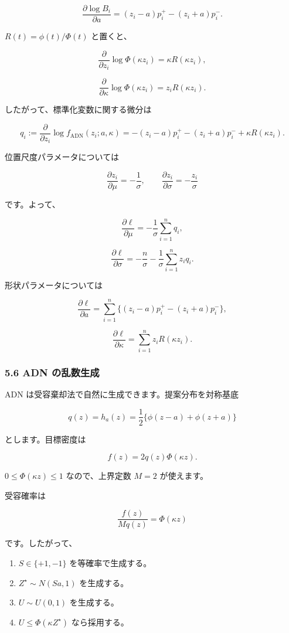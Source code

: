 \documentclass[
]{article}
\providecommand{\tightlist}{%
  \setlength{\itemsep}{0pt}\setlength{\parskip}{0pt}}
\begin{document}
\[
\frac{\partial \log B_i}{\partial a}
=(z_i-a)p_i^+-(z_i+a)p_i^-.
\]

\(R(t)=\phi(t)/\Phi(t)\) と置くと、

\[
\frac{\partial}{\partial z_i}\log\Phi(\kappa z_i)
=\kappa R(\kappa z_i),
\]

\[
\frac{\partial}{\partial \kappa}\log\Phi(\kappa z_i)
=z_iR(\kappa z_i).
\]

したがって、標準化変数に関する微分は

\[
q_i:=\frac{\partial}{\partial z_i}\log f_{\mathrm{ADN}}(z_i;a,\kappa)
=-(z_i-a)p_i^+-(z_i+a)p_i^-+\kappa R(\kappa z_i).
\]

位置尺度パラメータについては

\[
\frac{\partial z_i}{\partial \mu}=-\frac{1}{\sigma},
\qquad
\frac{\partial z_i}{\partial \sigma}=-\frac{z_i}{\sigma}
\]

です。よって、

\[
\frac{\partial \ell}{\partial \mu}
=-\frac{1}{\sigma}\sum_{i=1}^{n}q_i,
\]

\[
\frac{\partial \ell}{\partial \sigma}
=-\frac{n}{\sigma}-\frac{1}{\sigma}\sum_{i=1}^{n}z_iq_i.
\]

形状パラメータについては

\[
\frac{\partial \ell}{\partial a}
=\sum_{i=1}^{n}\{(z_i-a)p_i^+-(z_i+a)p_i^-\},
\]

\[
\frac{\partial \ell}{\partial \kappa}
=\sum_{i=1}^{n}z_iR(\kappa z_i).
\]

\hypertarget{adn-ux306eux4e71ux6570ux751fux6210}{%
\subsubsection{5.6 ADN
の乱数生成}\label{adn-ux306eux4e71ux6570ux751fux6210}}

ADN は受容棄却法で自然に生成できます。提案分布を対称基底

\[
q(z)=h_a(z)=\frac{1}{2}\{\phi(z-a)+\phi(z+a)\}
\]

とします。目標密度は

\[
f(z)=2q(z)\Phi(\kappa z).
\]

\(0\le \Phi(\kappa z)\le 1\) なので、上界定数 \(M=2\) が使えます。

受容確率は

\[
\frac{f(z)}{Mq(z)}=\Phi(\kappa z)
\]

です。したがって、

\begin{enumerate}
\def\labelenumi{\arabic{enumi}.}
\tightlist
\item
  \(S\in\{+1,-1\}\) を等確率で生成する。
\item
  \(Z^\star\sim N(Sa,1)\) を生成する。
\item
  \(U\sim U(0,1)\) を生成する。
\item
  \(U\le \Phi(\kappa Z^\star)\) なら採用する。
\end{enumerate}
\end{document}
